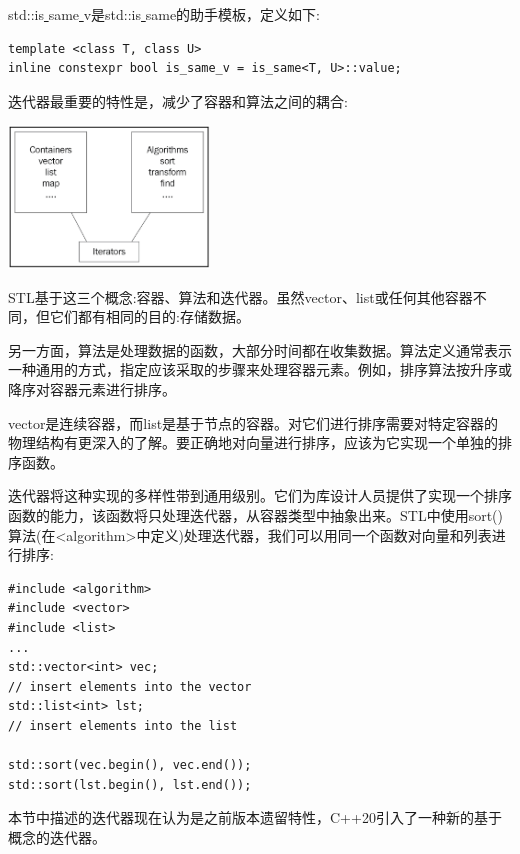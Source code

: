 std::is\underline{ }same\underline{ }v是std::is\underline{ }same的助手模板，定义如下: \par

\begin{lstlisting}[caption={}]
template <class T, class U>
inline constexpr bool is_same_v = is_same<T, U>::value;
\end{lstlisting}

迭代器最重要的特性是，减少了容器和算法之间的耦合: \par

\begin{center}
	\includegraphics[width=0.4\textwidth]{content/Section-2/Chapter-6/19}
\end{center}

STL基于这三个概念:容器、算法和迭代器。虽然vector、list或任何其他容器不同，但它们都有相同的目的:存储数据。 \par
另一方面，算法是处理数据的函数，大部分时间都在收集数据。算法定义通常表示一种通用的方式，指定应该采取的步骤来处理容器元素。例如，排序算法按升序或降序对容器元素进行排序。 \par
vector是连续容器，而list是基于节点的容器。对它们进行排序需要对特定容器的物理结构有更深入的了解。要正确地对向量进行排序，应该为它实现一个单独的排序函数。 \par
迭代器将这种实现的多样性带到通用级别。它们为库设计人员提供了实现一个排序函数的能力，该函数将只处理迭代器，从容器类型中抽象出来。STL中使用sort()算法(在<algorithm>中定义)处理迭代器，我们可以用同一个函数对向量和列表进行排序: \par

\begin{lstlisting}[caption={}]
#include <algorithm>
#include <vector>
#include <list>
...
std::vector<int> vec;
// insert elements into the vector
std::list<int> lst;
// insert elements into the list

std::sort(vec.begin(), vec.end());
std::sort(lst.begin(), lst.end());
\end{lstlisting}

本节中描述的迭代器现在认为是之前版本遗留特性，C++20引入了一种新的基于概念的迭代器。 \par


